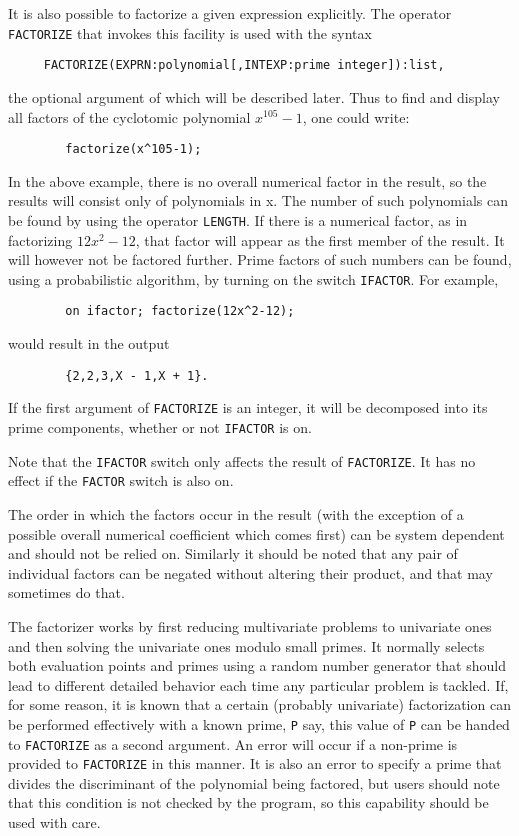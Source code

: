 It is also possible to factorize a given expression explicitly.  The
operator {\tt FACTORIZE} that invokes this facility is
used with the syntax
\begin{verbatim}
     FACTORIZE(EXPRN:polynomial[,INTEXP:prime integer]):list,
\end{verbatim}
the optional argument of which will be described later. Thus to find and
display all factors of the cyclotomic polynomial $x^{105}-1$, one could
write:
\begin{verbatim}
        factorize(x^105-1);
\end{verbatim}
In the above example, there is no overall numerical factor in the result,
so the results will consist only of polynomials in x.  The number of such
polynomials can be found by using the operator {\tt LENGTH}.
If there is a numerical factor, as in factorizing $12x^{2}-12$,
that factor will appear as the first member of the result.
It will however not be factored further.  Prime factors of such numbers
can be found, using a probabilistic algorithm, by turning on the switch
{\tt IFACTOR}.  For example,
\begin{verbatim}
        on ifactor; factorize(12x^2-12);
\end{verbatim}
would result in the output
\begin{verbatim}
        {2,2,3,X - 1,X + 1}.
\end{verbatim}

If the first argument of {\tt FACTORIZE} is an integer, it will be
decomposed into its prime components, whether or not {\tt IFACTOR} is on.

Note that the {\tt IFACTOR} switch only affects the result of {\tt FACTORIZE}.
It has no effect if the {\tt FACTOR} switch is also on.

The order in which the factors occur in the result (with the exception of
a possible overall numerical coefficient which comes first) can be system
dependent and should not be relied on. Similarly it should be noted that
any pair of individual factors can be negated without altering their
product, and that {\REDUCE} may sometimes do that.

The factorizer works by first reducing multivariate problems to univariate
ones and then solving the univariate ones modulo small primes. It normally
selects both evaluation points and primes using a random number generator
that should lead to different detailed behavior each time any particular
problem is tackled. If, for some reason, it is known that a certain
(probably univariate) factorization can be performed effectively with a
known prime, {\tt P} say, this value of {\tt P} can be handed to
{\tt FACTORIZE} as a second
argument. An error will occur if a non-prime is provided to {\tt FACTORIZE} in
this manner. It is also an error to specify a prime that divides the
discriminant of the polynomial being factored, but users should note that
this condition is not checked by the program, so this capability should be
used with care.

